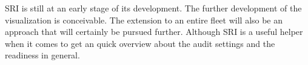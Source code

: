 \thispagestyle{plain}
SRI is still at an early stage of its development. The further development of the visualization is conceivable. The extension to an entire fleet will also be an approach that will certainly be pursued further. Although SRI is a useful helper when it comes to get an quick overview about the audit settings and the readiness in general.



\renewcommand\section{\clearpage\stdsection}